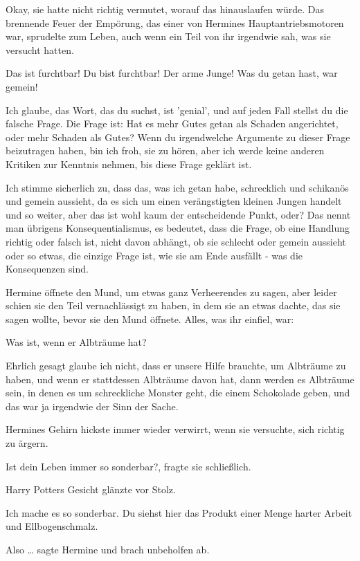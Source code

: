 Okay, sie hatte nicht richtig vermutet, worauf das hinauslaufen würde. Das
brennende Feuer der Empörung, das einer von Hermines Hauptantriebsmotoren war,
sprudelte zum Leben, auch wenn ein Teil von ihr irgendwie sah, was sie versucht
hatten.

\glqq{}Das ist furchtbar! Du bist furchtbar! Der arme Junge! Was du getan hast,
war gemein!\grqq{}

\glqq{}Ich glaube, das Wort, das du suchst, ist 'genial', und auf jeden Fall
stellst du die falsche Frage. Die Frage ist: Hat es mehr Gutes getan als Schaden
angerichtet, oder mehr Schaden als Gutes? Wenn du irgendwelche Argumente zu
dieser Frage beizutragen haben, bin ich froh, sie zu hören, aber ich werde keine
anderen Kritiken zur Kenntnis nehmen, bis diese Frage geklärt ist.

Ich stimme sicherlich zu, dass das, was ich getan habe, schrecklich und
schikanös und gemein aussieht, da es sich um einen verängstigten kleinen Jungen
handelt und so weiter, aber das ist wohl kaum der entscheidende Punkt, oder? Das
nennt man übrigens Konsequentialismus, es bedeutet, dass die Frage, ob eine
Handlung richtig oder falsch ist, nicht davon abhängt, ob sie schlecht oder
gemein aussieht oder so etwas, die einzige Frage ist, wie sie am Ende ausfällt -
was die Konsequenzen sind.\grqq{}

Hermine öffnete den Mund, um etwas ganz Verheerendes zu sagen, aber leider
schien sie den Teil vernachlässigt zu haben, in dem sie an etwas dachte, das sie
sagen wollte, bevor sie den Mund öffnete. Alles, was ihr einfiel, war:

\glqq{}Was ist, wenn er Albträume hat?\grqq{}

\glqq{}Ehrlich gesagt glaube ich nicht, dass er unsere Hilfe brauchte, um
Albträume zu haben, und wenn er stattdessen Albträume davon hat, dann werden es
Albträume sein, in denen es um schreckliche Monster geht, die einem Schokolade
geben, und das war ja irgendwie der Sinn der Sache.\grqq{}

Hermines Gehirn hickste immer wieder verwirrt, wenn sie versuchte, sich richtig
zu ärgern.

\glqq{}Ist dein Leben immer so sonderbar?\grqq{}, fragte sie schließlich.

Harry Potters Gesicht glänzte vor Stolz.

\glqq{}Ich mache es so sonderbar. Du siehst hier das Produkt einer Menge harter
Arbeit und Ellbogenschmalz.\grqq{}

\glqq{}Also …\grqq{} sagte Hermine und brach unbeholfen ab.

